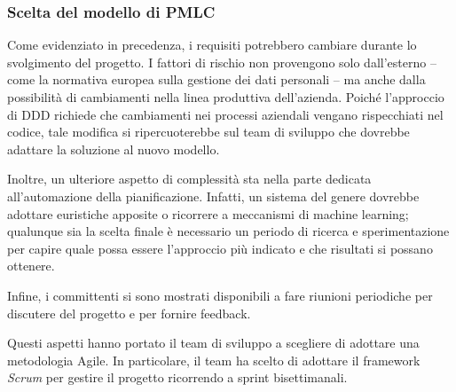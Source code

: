 \subsubsection{Scelta del modello di PMLC}
\label{sec:seconda-riunione-pmlc}
Come evidenziato in precedenza, i requisiti potrebbero cambiare durante lo svolgimento del progetto. I fattori di rischio non provengono solo dall'esterno -- come la normativa europea sulla gestione dei dati personali -- ma anche dalla possibilità di cambiamenti nella linea produttiva dell'azienda.
Poiché l'approccio di DDD richiede che cambiamenti nei processi aziendali vengano rispecchiati nel codice, tale modifica si ripercuoterebbe sul team di sviluppo che dovrebbe adattare la soluzione al nuovo modello.

Inoltre, un ulteriore aspetto di complessità sta nella parte dedicata all'automazione della pianificazione. Infatti, un sistema del genere dovrebbe adottare euristiche apposite o ricorrere a meccanismi di machine learning; qualunque sia la scelta finale è necessario un periodo di ricerca e sperimentazione per capire quale possa essere l'approccio più indicato e che risultati si possano ottenere.

Infine, i committenti si sono mostrati disponibili a fare riunioni periodiche per discutere del progetto e per fornire feedback.

Questi aspetti hanno portato il team di sviluppo a scegliere di adottare una metodologia Agile. In particolare, il team ha scelto di adottare il framework \emph{Scrum} per gestire il progetto ricorrendo a sprint bisettimanali.
